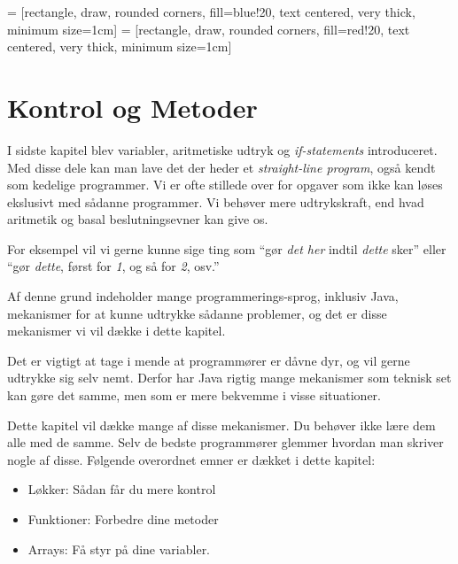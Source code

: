 

\usetikzlibrary{shapes,arrows,graphs}

  = [rectangle, draw, rounded corners, fill=blue!20, text centered, very thick, minimum size=1cm]
 = [rectangle, draw, rounded corners, fill=red!20,  text centered, very thick, minimum size=1cm]



\chapter{Kontrol og Metoder}


    I sidste kapitel blev variabler, aritmetiske udtryk og
    \emph{if-statements} introduceret. Med disse dele kan man lave det
    der heder et \emph{straight-line program}, også kendt som kedelige
    programmer. Vi er ofte stillede over for opgaver som ikke kan
    løses ekslusivt med sådanne programmer. Vi behøver mere
    udtrykskraft, end hvad aritmetik og basal beslutningsevner kan
    give os.

    For eksempel vil vi gerne kunne sige ting som ``gør \emph{det her} indtil
	\emph{dette} sker'' eller ``gør \emph{dette}, først for \emph{1}, og så for
	\emph{2}, osv.''

	Af denne grund indeholder mange programmerings-sprog, inklusiv Java,
	mekanismer for at kunne udtrykke sådanne problemer, og det er disse
	mekanismer vi vil dække i dette kapitel.

	Det er vigtigt at tage i mende at programmører er dåvne dyr, og vil gerne
	udtrykke sig selv nemt. Derfor har Java rigtig mange mekanismer som teknisk
	set kan gøre det samme, men som er mere bekvemme i visse situationer.

    Dette kapitel vil dække mange af disse mekanismer. Du behøver ikke
    lære dem alle med de samme. Selv de bedste programmører glemmer
    hvordan man skriver nogle af disse. Følgende overordnet emner er
    dækket i dette kapitel:

	\begin{itemize} %
		\item Løkker: Sådan får du mere kontrol
		\item Funktioner: Forbedre dine metoder
		\item Arrays: Få styr på dine variabler.
	\end{itemize}

